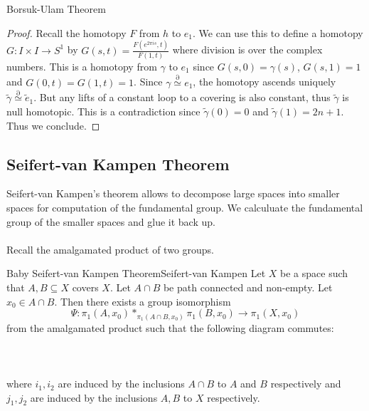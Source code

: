 \documentclass[a4paper]{article}
\begin{document}
\begin{prp}{Borsuk-Ulam Theorem}{}
\begin{proof}
Recall the homotopy $F$ from $h$ to $e_1$. We can use this to define a homotopy $G:I\times I\to S^1$ by $G(s,t)=\frac{F(e^{2\pi is},t)}{F(1,t)}$ where division is over the complex numbers. This is a homotopy from $\gamma$ to $e_1$ since $G(s,0)=\gamma(s)$, $G(s,1)=1$ and $G(0,t)=G(1,t)=1$. Since $\gamma\overset{\partial}{\simeq} e_1$, the homotopy ascends uniquely $\tilde{\gamma}\overset{\partial}{\simeq}\tilde{e}_1$. But any lifts of a constant loop to a covering is also constant, thus $\tilde{\gamma}$ is null homotopic. This is a contradiction since $\tilde{\gamma}(0)=0$ and $\tilde{\gamma}(1)=2n+1$. Thus we conclude. 
\end{proof}
\end{prp}

\subsection{Seifert-van Kampen Theorem}
Seifert-van Kampen's theorem allows to decompose large spaces into smaller spaces for computation of the fundamental group. We calculuate the fundamental group of the smaller spaces and glue it back up. \\~\\

Recall the amalgamated product of two groups. 

\begin{thm}{Baby Seifert-van Kampen Theorem}{Seifert-van Kampen} Let $X$ be a space such that $A,B\subseteq X$ covers $X$. Let $A\cap B$ be path connected and non-empty. Let $x_0\in A\cap B$. Then there exists a group isomorphism $$\Psi:\pi_1(A,x_0)\ast_{\pi_1(A\cap B,x_0)}\pi_1(B,x_0)\to\pi_1(X,x_0)$$ from the amalgamated product such that the following diagram commutes: \\~\\
\\~\\
where $i_1,i_2$ are induced by the inclusions $A\cap B$ to $A$ and $B$ respectively and $j_1,j_2$ are induced by the inclusions $A,B$ to $X$ respectively. 
\end{thm}
\end{document}

